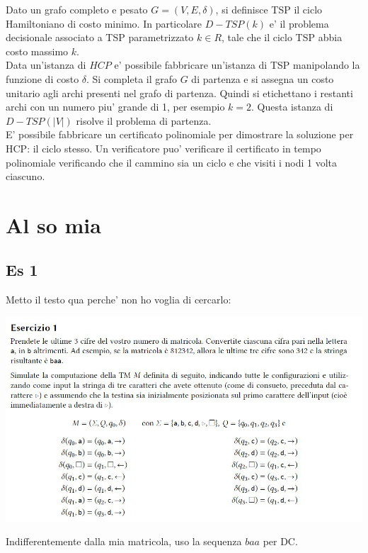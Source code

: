 \documentclass[a4paper,10pt,oneside]{book}
\begin{document}
Dato un grafo completo e pesato $G = (V, E, \delta)$, si definisce TSP il ciclo Hamiltoniano di costo minimo. In particolare $D-TSP(k)$ e' il problema decisionale associato a TSP parametrizzato $k \in R$, tale che il ciclo TSP abbia costo massimo $k$.\\

Data un'istanza di $HCP$ e' possibile fabbricare un'istanza di TSP manipolando la funzione di costo $\delta$. Si completa il grafo $G$ di partenza e si assegna un costo unitario agli archi presenti nel grafo di partenza. Quindi si etichettano i restanti archi con un numero piu' grande di 1, per esempio $k = 2$. Questa istanza di $D-TSP(|V|)$ risolve il problema di partenza.\\

E' possibile fabbricare un certificato polinomiale per dimostrare la soluzione per HCP: il ciclo stesso. Un verificatore puo' verificare il certificato in tempo polinomiale verificando che il cammino sia un ciclo e che visiti i nodi 1 volta ciascuno.

\chapter{Al so mia}

\section{Es 1}

Metto il testo qua perche' non ho voglia di cercarlo:

\begin{center}
    \includegraphics[width=1\linewidth]{photo_2023-11-13_17-24-47.jpg}
\end{center}

Indifferentemente dalla mia matricola, uso la sequenza $baa$ per DC.
\end{document}
